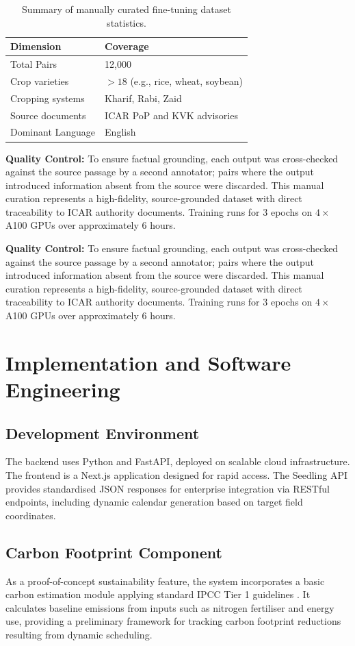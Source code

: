 \documentclass[10pt,twocolumn,letterpaper]{article}
\begin{document}
\begin{table}[h]
\centering
\caption{Summary of manually curated fine-tuning dataset statistics.}
\label{tab:data_stats}
\begin{tabular}{ll}
\toprule
\textbf{Dimension} & \textbf{Coverage} \\
\midrule
Total Pairs & 12,000 \\
Crop varieties & $> 18$ (e.g., rice, wheat, soybean) \\
Cropping systems & Kharif, Rabi, Zaid \\
Source documents & ICAR PoP and KVK advisories \\
Dominant Language & English \\
\bottomrule
\end{tabular}
\end{table}

\textbf{Quality Control:} To ensure factual grounding, each output was cross-checked against the source passage by a second annotator; pairs where the output introduced information absent from the source were discarded. This manual curation represents a high-fidelity, source-grounded dataset with direct traceability to ICAR authority documents. Training runs for 3 epochs on $4 \times$ A100 GPUs over approximately 6 hours.


\textbf{Quality Control:} To ensure factual grounding, each output was cross-checked against the source passage by a second annotator; pairs where the output introduced information absent from the source were discarded. This manual curation represents a high-fidelity, source-grounded dataset with direct traceability to ICAR authority documents. Training runs for 3 epochs on $4 \times$ A100 GPUs over approximately 6 hours.

\section{Implementation and Software Engineering}
\subsection{Development Environment}
The backend uses Python and FastAPI, deployed on scalable cloud infrastructure. The frontend is a Next.js application designed for rapid access. The Seedling API provides standardised JSON responses for enterprise integration via RESTful endpoints, including dynamic calendar generation based on target field coordinates.

\subsection{Carbon Footprint Component}
As a proof-of-concept sustainability feature, the system incorporates a basic carbon estimation module applying standard IPCC Tier 1 guidelines \cite{IPCC_2019}. It calculates baseline emissions from inputs such as nitrogen fertiliser and energy use, providing a preliminary framework for tracking carbon footprint reductions resulting from dynamic scheduling.
\end{document}
